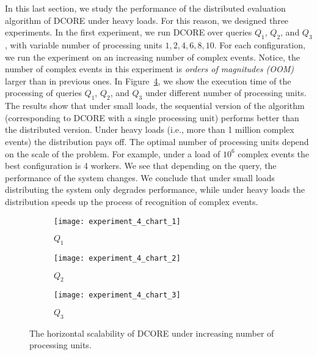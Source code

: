 In this last section, we study the performance of the distributed evaluation algorithm of DCORE under heavy loads. For this reason, we designed three experiments. In the first experiment, we run DCORE over queries $Q_{1}$, $Q_{2}$, and $Q_{3}$, with variable number of processing units $1, 2, 4, 6, 8, 10$. For each configuration, we run the experiment on an increasing number of complex events. Notice, the number of complex events in this experiment is \emph{orders of magnitudes (OOM)} larger than in previous ones. In Figure~\ref{fig:experiment:4}, we show the execution time of the processing of queries $Q_{1}$, $Q_{2}$, and $Q_{3}$ under different number of processing units. The results show that under small loads, the sequential version of the algorithm (corresponding to DCORE with a single processing unit) performs better than the distributed version. Under heavy loads (i.e., more than 1 million complex events) the distribution pays off. The optimal number of processing units depend on the scale of the problem. For example, under a load of $10^{6}$ complex events the best configuration is 4 workers. We see that depending on the query, the performance of the system changes. We conclude that under small loads distributing the system only degrades performance, while under heavy loads the distribution speeds up the process of recognition of complex events.

\begin{figure}[t]
     \begin{adjustbox}{max width=1.3\linewidth,center}
     \centering
     \begin{subfigure}[b]{0.7\textwidth}
         \centering
         \texttt{[image: experiment\_4\_chart\_1]}
         \caption{$Q_{1}$}
         \label{fig:experiment:4:subfigure:1}
     \end{subfigure}
     \begin{subfigure}[b]{0.7\textwidth}
         \centering
         \texttt{[image: experiment\_4\_chart\_2]}
         \caption{$Q_{2}$}
         \label{fig:experiment:4:subfigure:2}
     \end{subfigure}
     \end{adjustbox}
     \begin{center}
     \begin{subfigure}[b]{0.7\textwidth}
         \centering
         \texttt{[image: experiment\_4\_chart\_3]}
         \caption{$Q_{3}$}
         \label{fig:experiment:4:subfigure:3}
     \end{subfigure}
     \end{center}
     \caption{The horizontal scalability of DCORE under increasing number of processing units.}
     \label{fig:experiment:4}
\end{figure}

